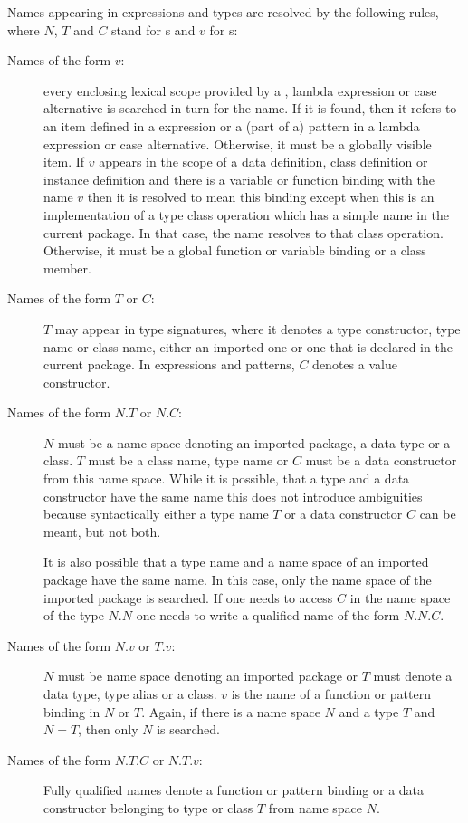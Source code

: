 Names appearing in expressions and types are resolved by the following rules, where $N$, $T$ and $C$ stand for s and $v$ for s:

\begin{description}
\item [Names of the form $v$:] every enclosing lexical scope provided by a , lambda expression or case alternative is searched in turn for the name.  If it is found, then it refers to an item defined in a  expression or a (part of a) pattern in a lambda expression or case alternative. Otherwise, it must be a globally visible item. If $v$ appears in the scope of a data definition, class definition or instance definition and there is a variable or function binding with the name $v$ then it is resolved to mean this binding except when this is an implementation of a type class operation which has a simple name in the current package. In that case, the name resolves to that class operation. Otherwise, it must be a global function or variable binding or a class member.
\item [Names of the form $T$ or $C$:] $T$ may appear in type signatures, where it denotes a type constructor, type name or class name, either an imported one or one that is declared in the current package. In expressions and patterns, $C$ denotes a value constructor.
\item[Names of the form $N$.$T$ or $N$.$C$:] $N$ must be a name space denoting an imported package, a data type or a class. $T$ must be a class name, type name or $C$ must be a data constructor from this name space. While it is possible, that a type and a data constructor have the same name this does not introduce ambiguities because syntactically either a type name $T$ or a data constructor $C$ can be meant, but not both.

It is also possible that a type name and a name space of an imported package have the same name. In this case, only the name space of the imported package is searched. If one needs to access $C$ in the name space of the type $N$.$N$ one needs to write a qualified name of the form $N$.$N$.$C$.
\item[Names of the form $N$.$v$ or $T$.$v$:]
$N$ must be name space denoting an imported package or $T$ must denote a data type, type alias or a class.
$v$ is the name of a function or pattern binding in $N$ or $T$. Again, if there is a name space $N$ and a type $T$ and $N = T$, then only $N$ is searched.
\item[Names of the form $N$.$T$.$C$ or $N$.$T$.$v$:] Fully qualified names denote a function or pattern binding or a data constructor belonging to type or class $T$ from name space $N$.
\end{description}

